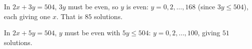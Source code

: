 In $2x+3y=504$, $3y$ must be even, so $y$ is even: $y=0,2,\dots,168$ (since $3y\le504$), each giving one $x$. That is $\boxed{85}$ solutions.

In $2x+5y=504$, $y$ must be even with $5y\le504$: $y=0,2,\dots,100$, giving $\boxed{51}$ solutions.
